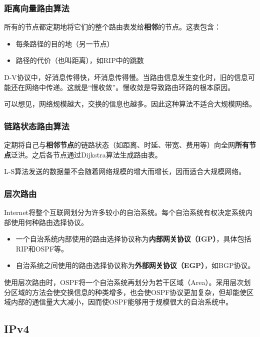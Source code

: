 \documentclass[12pt, a4paper, oneside]{ctexart}
\begin{document}
\subsubsection{距离向量路由算法}

所有的节点都定期地将它们的整个路由表发给\textbf{相邻}的节点。这表包含：
\begin{itemize}
    \item 每条路径的目的地（另一节点）
    \item 路径的代价（也叫距离），如RIP中的跳数
\end{itemize}

D-V协议中，好消息传得快，坏消息传得慢。当路由信息发生变化时，旧的信息可能还在网络中传递。这就是“慢收敛”。慢收敛是导致路由环路的根本原因。

可以想见，网络规模越大，交换的信息也越多。因此这种算法不适合大规模网络。

\subsubsection{链路状态路由算法}

定期将自己与\textbf{相邻节点}的链路状态（如距离、时延、带宽、费用等）向全网\textbf{所有节点}泛洪。之后各节点通过Dijkstra算法生成路由表。

L-S算法发送的数据量不会随着网络规模的增大而增长，因而适合大规模网络。

\subsubsection{层次路由}

Internet将整个互联网划分为许多较小的自治系统。每个自治系统有权决定系统内部使用何种路由选择协议。
\begin{itemize}
    \item 一个自治系统内部使用的路由选择协议称为\textbf{内部网关协议（IGP）}，具体包括RIP和OSPF等。
    \item 自治系统之间使用的路由选择协议称为\textbf{外部网关协议（EGP）}，如BGP协议。
\end{itemize}

使用层次路由时，OSPF将一个自治系统再划分为若干区域（Area）。采用层次划分区域的方法会使交换信息的种类增多，也会使OSPF协议更加复杂，但却能使区域内部的通信量大大减小，因而使OSPF能够用于规模很大的自治系统中。

\subsection{IPv4}
\end{document}
